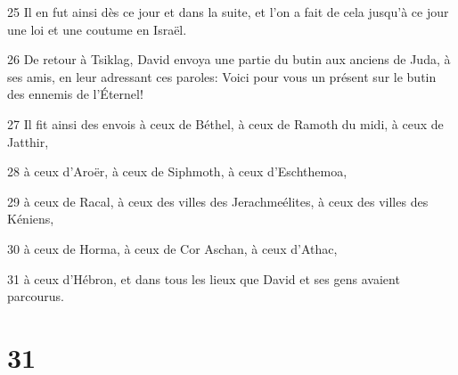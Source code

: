 \par 25 Il en fut ainsi dès ce jour et dans la suite, et l'on a fait de cela jusqu'à ce jour une loi et une coutume en Israël.
\par 26 De retour à Tsiklag, David envoya une partie du butin aux anciens de Juda, à ses amis, en leur adressant ces paroles: Voici pour vous un présent sur le butin des ennemis de l'Éternel!
\par 27 Il fit ainsi des envois à ceux de Béthel, à ceux de Ramoth du midi, à ceux de Jatthir,
\par 28 à ceux d'Aroër, à ceux de Siphmoth, à ceux d'Eschthemoa,
\par 29 à ceux de Racal, à ceux des villes des Jerachmeélites, à ceux des villes des Kéniens,
\par 30 à ceux de Horma, à ceux de Cor Aschan, à ceux d'Athac,
\par 31 à ceux d'Hébron, et dans tous les lieux que David et ses gens avaient parcourus.

\chapter{31}

